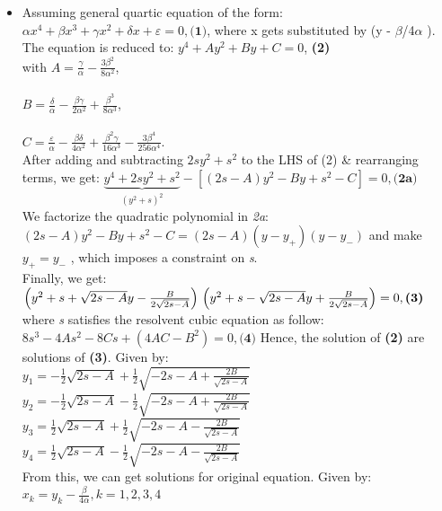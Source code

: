 \documentclass[conference]{IEEEtran}
\begin{document}
\begin{itemize}

\item Assuming general quartic equation of the form: $\alpha x^{4}+\beta x^{3}+\gamma x^{2}+\delta x+\varepsilon =0, \textbf{(1)}$, where x gets substituted by (y - $\beta$/4$\alpha$ ). \\
The equation is reduced to: $y^{4}+Ay^{2}+By+C=0$, \textbf{(2)}\\
with $A=\frac{\gamma }{\alpha }-\frac{3\beta ^{2}}{8\alpha ^{2}}$, \\
\\
$B=\frac{\delta }{\alpha }-\frac{\beta \gamma }{2\alpha ^{2}}+\frac{\beta^3 }{8\alpha^3 }$, \\
\\
$C=\frac{\varepsilon }{\alpha }-\frac{\beta \delta }{4\alpha ^{2}}+\frac{\beta ^{2}\gamma}{16\alpha ^{3}}-\frac{3\beta ^{4}}{256\alpha ^{4}}$. \\
After adding and subtracting $2sy^{2}+s^{2}$ to the LHS of (2) \& rearranging terms, we get: $\underset{\left( y^{2}+s\right) ^{2}}{\underbrace{y^{4}+2sy^{2}+s^{2}}}-\left[ \left( 2s-A\right) y^{2}-By+s^{2}-C\right] =0,  \textbf{(2a)}$
\\
We factorize the quadratic polynomial in \textit{2a}: $\left(2s-A\right) y^{2}-By+s^{2}-C=\left(2s-A\right)(y-y_+)(y-y_-)$ and make $y_+=y_-$ , which imposes a constraint on \textit{s}.
\\
Finally, we get: $\left( y^{2}+s+\sqrt{2s-A}y-\frac{B}{2\sqrt{2s-A}}\right)  \\
 \left( y^{2}+s-\sqrt{2s-A}y+\frac{B}{2\sqrt{2s-A}}\right)=0, \textbf{(3)}$ where \textit{s} satisfies the resolvent cubic equation as follow: $8s^{3}-4As^{2}-8Cs+\left( 4AC-B^{2}\right)=0, \textbf{(4)}$ Hence, the solution of \textbf{(2)} are solutions of \textbf{(3)}. Given by: \\

$y_{1}=-\frac{1}{2}\sqrt{2s-A}+\frac{1}{2}\sqrt{-2s-A+\frac{2B}{\sqrt{2s-A}}}$ \\
$y_{2}=-\frac{1}{2}\sqrt{2s-A}-\frac{1}{2}\sqrt{-2s-A+\frac{2B}{\sqrt{2s-A}}}$ \\
$y_{3}=\frac{1}{2}\sqrt{2s-A}+\frac{1}{2}\sqrt{-2s-A-\frac{2B}{\sqrt{2s-A}}}$ \\
$y_{4}=\frac{1}{2}\sqrt{2s-A}-\frac{1}{2}\sqrt{-2s-A-\frac{2B}{\sqrt{2s-A}}}$ \\

From this, we can get solutions for original equation. Given by: $x_{k}=y_{k}-\frac{\beta }{4\alpha },  k=1,2,3,4$

\end{itemize}
\end{document}
